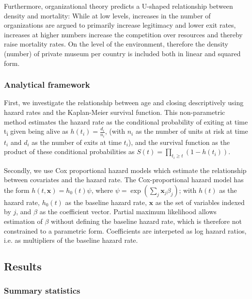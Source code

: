 \documentclass[12pt]{article}
\begin{document}
Furthermore, organizational theory \parencite{hannan89_organ} predicts a U-shaped relationship between density and mortality:
While at low levels, increases in the number of organizations are argued to primarily increase legitimacy and lower exit rates, increases at higher numbers increase the competition over resources and thereby raise mortality rates.
On the level of the environment, therefore the density (number) of private museum per country is included both in linear and squared form.



\subsubsection*{Analytical framework}



First, we investigate the relationship between age and closing descriptively using hazard rates and the Kaplan-Meier survival function.
This non-parametric method estimates the hazard rate as the conditional probability of exiting at time t\textsubscript{i} given being alive as \(h(t_i) = \frac{d_i}{n_i}\), (with \(n_i\) as the number of units at risk at time \(t_i\) and \(d_i\) as the number of exits at time \(t_i\)), and the survival function as the product of these conditional probabilities as \(S(t) = \prod_{t_i \geq t} \left(1-h(t_i) \right)\).



Secondly, we use Cox proportional hazard models which estimate the relationship between covariates and the hazard rate.
The Cox-proportional hazard model has the form \(h(t,\mathbf{x}) = h_0(t) \psi\), where \(\psi = \exp(\sum_{j} \mathbf{x}_j \beta_j)\); with \(h(t)\) as the hazard rate, \(h_0(t)\) as the baseline hazard rate, \(\mathbf{x}\) as the set of variables indexed by \(j\), and \(\beta\) as the coefficient vector.
Partial maximum likelihood allows estimation of \(\beta\) without defining the baseline hazard rate, which is therefore not constrained to a parametric form. 
Coefficients are interpeted as log hazard ratios, i.e. as multipliers of the baseline hazard rate. 



\subsection*{Results}


\subsubsection*{Summary statistics}
\end{document}
